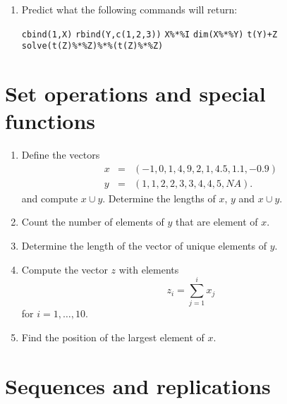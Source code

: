 \documentclass{article}
\begin{document}
\begin{enumerate}
\item Predict what the following commands will return:

\texttt{cbind(1,X)}\newline
\texttt{rbind(Y,c(1,2,3))}\newline
\texttt{X\%*\%I}\newline
\texttt{dim(X\%*\%Y)}\newline
\texttt{t(Y)+Z}\newline
\texttt{solve(t(Z)\%*\%Z)\%*\%(t(Z)\%*\%Z)}
\end{enumerate}
\newpage


\section{Set operations and special functions}

\begin{enumerate}
\item Define the vectors%
\begin{eqnarray*}
x &=&\left( -1,0,1,4,9,2,1,4.5,1.1,-0.9\right) \\
y &=&\left( 1,1,2,2,3,3,4,4,5,NA\right) .
\end{eqnarray*}%
and compute $x\cup y$. Determine the lengths of $x$, $y$ and $x\cup y$.

\item Count the number of elements of $y$ that are element of $x$.

\item Determine the length of the vector of unique elements of $y$.

\item Compute the vector $z$ with elements%
\begin{equation*}
z_{i}=\sum_{j=1}^{i}x_{j}
\end{equation*}%
for $i=1,\ldots ,10$.

\item Find the position of the largest
element of $x$.
\end{enumerate}
\newpage


\section{Sequences and replications}
\end{document}
